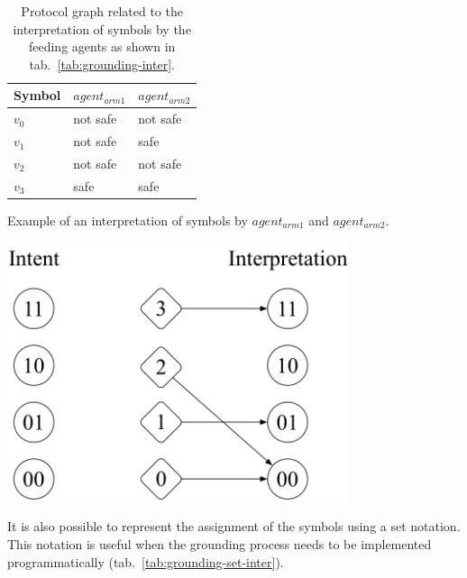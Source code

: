 \begin{table}[H]
\centering
\begin{minipage}[b]{.5\textwidth}
\vspace{0pt}
     \centering
    \begin{tabular}{lll}
    \toprule
    Symbol & $agent_{arm1}$ & $agent_{arm2}$ \\
    \midrule
    $v_0$ & not safe & not safe \\
    $v_1$ & not safe &  safe \\
    $v_2$ & not safe & not safe \\
    $v_3$ & safe & safe \\
    \bottomrule
    \end{tabular}
    \caption[Interpretation of symbols by the feeding agents]{Example of an interpretation of symbols by $agent_{arm1}$ and $agent_{arm2}$.}
    \label{tab:grounding-inter}
\end{minipage}%
\begin{minipage}[b]{.50\textwidth}
    \vspace{0pt}
    \centering
    \includegraphics[width=0.75\textwidth]{imgs/grounding-inter.png}
    \caption[Protocol graph related to the interpretation of symbols by the feeding agents]{Protocol graph related to the interpretation of symbols by the feeding agents as shown in tab.~\ref{tab:grounding-inter}.}
    \label{fig:grounding-inter}
\end{minipage}
\end{table}

It is also possible to represent the assignment of the symbols using a set notation. This notation is useful when the grounding process needs to be implemented programmatically (tab.~\ref{tab:grounding-set-inter}).


